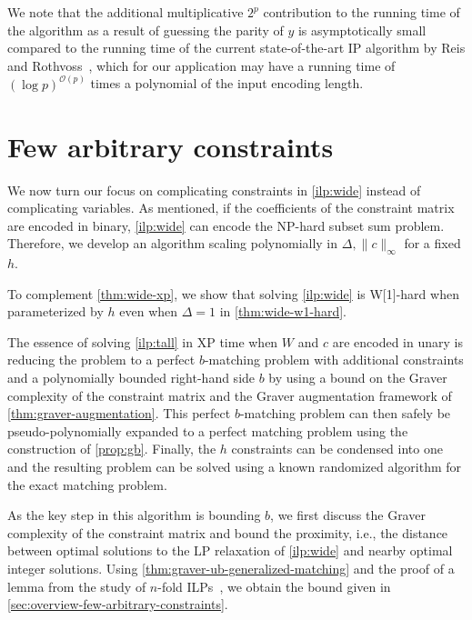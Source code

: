 \documentclass[a4paper,UKenglish,cleveref,thm-restate]{lipics-v2021}
\renewcommand{\O}{\mathcal O}
\begin{document}
We note that the additional multiplicative $2^p$ contribution to the running time of the algorithm as a result of guessing the parity of $y$ is asymptotically small compared to the running time of the current state-of-the-art IP algorithm by Reis and Rothvoss~\cite{DBLP:conf/focs/ReisR23}, which for our application may have a running time of $(\log p)^{\O(p)}$ times a polynomial of the input encoding length. 
\section{Few arbitrary constraints}
\label{sec:wide}

We now turn our focus on complicating constraints in \cref{ilp:wide} instead of complicating variables. As mentioned, if the coefficients of the constraint matrix are encoded in binary, \cref{ilp:wide} can encode the NP-hard subset sum problem. Therefore, we develop an algorithm scaling polynomially in $\Delta,\|c\|_\infty$ for a fixed $h$.

\thmwidexp*

To complement \cref{thm:wide-xp}, we show that solving \cref{ilp:wide} is W[1]-hard when parameterized by $h$ even when $\Delta=1$ in \cref{thm:wide-w1-hard}.

The essence of solving \cref{ilp:tall} in XP time when $W$ and $c$ are encoded in unary is reducing the problem to a perfect $b$-matching problem with additional constraints and a polynomially bounded right-hand side $b$ by using a bound on the Graver complexity of the constraint matrix and the Graver augmentation framework of \cref{thm:graver-augmentation}. This perfect $b$-matching problem can then safely be pseudo-polynomially expanded to a perfect matching problem using the construction of \cref{prop:gb}. Finally, the $h$ constraints can be condensed into one and the resulting problem can be solved using a known randomized algorithm for the exact matching problem.

As the key step in this algorithm is bounding $b$, we first discuss the Graver complexity of the constraint matrix and bound the proximity, i.e., the distance between optimal solutions to the LP relaxation of \cref{ilp:wide} and nearby optimal integer solutions.  Using \cref{thm:graver-ub-generalized-matching} and the proof of a lemma from the study of $n$-fold ILPs~\cite{DBLP:conf/icalp/EisenbrandHK18}, we obtain the bound given in \cref{sec:overview-few-arbitrary-constraints}.

\corgraverubwide*
\end{document}

